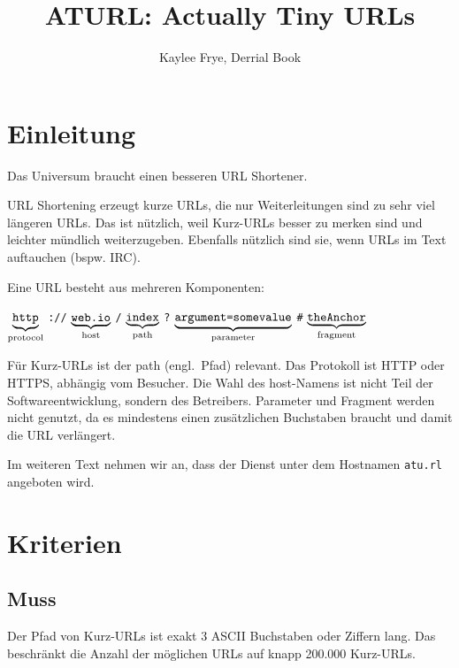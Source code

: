 \documentclass[parskip=full,11pt,twoside]{scrartcl}
\title{ATURL: Actually Tiny URLs}
\author{Kaylee Frye, Derrial Book}
\newcommand\urlpart[2]{$\underbrace{\text{\texttt{#1}}}_{\text{#2}}$}
\begin{document}
\maketitle

\section{Einleitung}

Das Universum braucht einen besseren URL Shortener.

URL Shortening erzeugt kurze URLs,
die nur Weiterleitungen sind zu sehr viel längeren URLs.
Das ist nützlich, weil Kurz-URLs besser zu merken sind
und leichter mündlich weiterzugeben.
Ebenfalls nützlich sind sie,
wenn URLs im Text auftauchen (bspw. IRC).

Eine URL besteht aus mehreren Komponenten:

\begin{center}
\urlpart{http}{protocol}%
\texttt{://}%
\urlpart{web.io}{host}%
\texttt{/}%
\urlpart{index}{path}%
\texttt{?}%
\urlpart{argument=somevalue}{parameter}%
\texttt{\#}%
\urlpart{theAnchor}{fragment}
\end{center}

Für Kurz-URLs ist der path (engl.\ Pfad) relevant.
Das Protokoll ist HTTP oder HTTPS, abhängig vom Besucher.
Die Wahl des host-Namens ist nicht Teil der Softwareentwicklung,
sondern des Betreibers.
Parameter und Fragment werden nicht genutzt,
da es mindestens einen zusätzlichen Buchstaben braucht
und damit die URL verlängert.

Im weiteren Text nehmen wir an,
dass der Dienst unter dem Hostnamen \texttt{atu.rl} angeboten wird.

\pagebreak
\section{Kriterien}

\subsection{Muss}


Der Pfad von Kurz-URLs ist exakt 3 ASCII Buchstaben oder Ziffern lang.
Das beschränkt die Anzahl der möglichen URLs auf knapp 200.000 Kurz-URLs.

\end{document}
